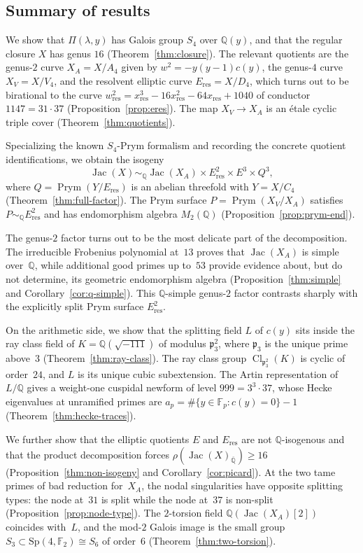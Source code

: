 \documentclass[11pt,letterpaper]{article}
\theoremstyle{plain}
\theoremstyle{remark}
\newcommand{\QQ}{\mathbb{Q}}
\newcommand{\Jac}{\operatorname{Jac}}
\newcommand{\Prym}{\operatorname{Prym}}
\newcommand{\Cl}{\operatorname{Cl}}
\newcommand{\F}{\mathbb{F}}
\begin{document}
\subsection{Summary of results}
We show that \(\Pi(\lambda,y)\) has Galois group \(S_4\) over \(\QQ(y)\), and that the regular closure \(X\) has genus \(16\) (Theorem~\ref{thm:closure}). The relevant quotients are the genus-\(2\) curve \(X_A=X/A_4\) given by \(w^2=-y(y-1)c(y)\), the genus-\(4\) curve \(X_V=X/V_4\), and the resolvent elliptic curve \(E_{\mathrm{res}}=X/D_4\), which turns out to be birational to the curve \(w_{\mathrm{res}}^2=x_{\mathrm{res}}^3-16x_{\mathrm{res}}^2-64x_{\mathrm{res}}+1040\) of conductor \(1147=31\cdot 37\) (Proposition~\ref{prop:eres}). The map \(X_V\to X_A\) is an \'etale cyclic triple cover (Theorem~\ref{thm:quotients}).

Specializing the known \(S_4\)-Prym formalism and recording the concrete quotient identifications, we obtain the isogeny
\[
\Jac(X)\sim_{\QQ}\Jac(X_A)\times E_{\mathrm{res}}^2\times E^3\times Q^3,
\]
where \(Q=\Prym(Y/E_{\mathrm{res}})\) is an abelian threefold with \(Y=X/C_4\) (Theorem~\ref{thm:full-factor}). The Prym surface \(P=\Prym(X_V/X_A)\) satisfies \(P\sim_{\QQ}E_{\mathrm{res}}^2\) and has endomorphism algebra \(M_2(\QQ)\) (Proposition~\ref{prop:prym-end}).

The genus-\(2\) factor turns out to be the most delicate part of the decomposition. The irreducible Frobenius polynomial at~\(13\) proves that \(\Jac(X_A)\) is simple over~\(\QQ\), while additional good primes up to~\(53\) provide evidence about, but do not determine, its geometric endomorphism algebra (Proposition~\ref{thm:simple} and Corollary~\ref{cor:q-simple}). This \(\QQ\)-simple genus-\(2\) factor contrasts sharply with the explicitly split Prym surface \(E_{\mathrm{res}}^2\).

On the arithmetic side, we show that the splitting field \(L\) of \(c(y)\) sits inside the ray class field of \(K=\QQ(\sqrt{-111})\) of modulus \(\mathfrak{p}_3^2\), where \(\mathfrak{p}_3\) is the unique prime above~\(3\) (Theorem~\ref{thm:ray-class}). The ray class group \(\Cl_{\mathfrak{p}_3^2}(K)\) is cyclic of order~\(24\), and \(L\) is its unique cubic subextension. The Artin representation of \(L/\QQ\) gives a weight-one cuspidal newform of level \(999=3^3\cdot 37\), whose Hecke eigenvalues at unramified primes are \(a_p=\#\{y\in\F_p:c(y)=0\}-1\) (Theorem~\ref{thm:hecke-traces}).

We further show that the elliptic quotients \(E\) and \(E_{\mathrm{res}}\) are not \(\QQ\)-isogenous and that the product decomposition forces \(\rho(\Jac(X)_{\overline{\QQ}})\geq 16\) (Proposition~\ref{thm:non-isogeny} and Corollary~\ref{cor:picard}). At the two tame primes of bad reduction for~\(X_A\), the nodal singularities have opposite splitting types: the node at~\(31\) is split while the node at~\(37\) is non-split (Proposition~\ref{prop:node-type}). The \(2\)-torsion field \(\QQ(\Jac(X_A)[2])\) coincides with~\(L\), and the mod-\(2\) Galois image is the small group \(S_3\subset\mathrm{Sp}(4,\F_2)\cong S_6\) of order~\(6\) (Theorem~\ref{thm:two-torsion}).
\end{document}
